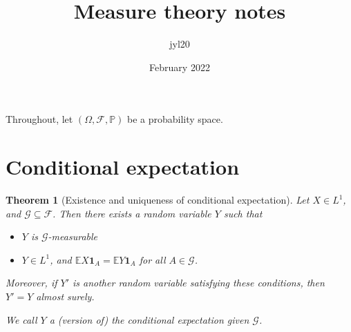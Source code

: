 \documentclass[parskip=full]{article}
\title{Measure theory notes}
\author{jyl20 }
\date{February 2022}
\newtheorem{theorem}{Theorem}[section]
\theoremstyle{definition}
\newcommand{\F}{\mathcal{F}}
\newcommand{\Pbb}{\mathbb{P}}
\newcommand{\1}{\mathbbm{1}}
\newcommand{\E}{\mathbb{E}}
\begin{document}
Throughout, let $(\Omega, \F, \Pbb)$ be a probability space.
\section{Conditional expectation}
\begin{theorem}[Existence and uniqueness of conditional expectation]
    Let $X \in L^1$, and $\mathcal{G} \subseteq \mathcal{F}$. Then there exists a random variable $Y$ such that
    \begin{itemize}
      \item $Y$ is $\mathcal{G}$-measurable
      \item $Y \in L^1$, and $\E X \mathbf{1}_A = \E Y \mathbf{1}_A$ for all $A \in \mathcal{G}$.
    \end{itemize}

    Moreover, if $Y'$ is another random variable satisfying these conditions, then $Y' = Y$ almost surely.

    We call $Y$ a (version of) the conditional expectation given $\mathcal{G}$.
\end{theorem}
\end{document}

